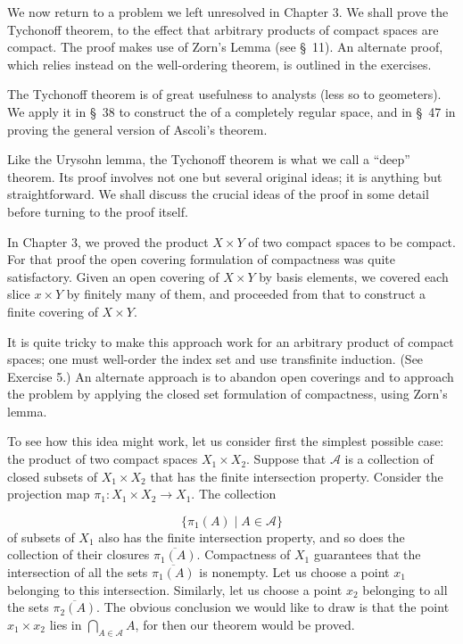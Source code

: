 
We now return to a problem we left unresolved in Chapter 3. We shall prove the Tychonoff theorem, to the effect that arbitrary products of compact spaces are compact. The proof makes use of Zorn's Lemma (see \S\ 11). An alternate proof, which relies instead on the well-ordering theorem, is outlined in the exercises.

The Tychonoff theorem is of great usefulness to analysts (less so to geometers). We apply it in \S\ 38 to construct the  of a completely regular space, and in \S\ 47 in proving the general version of Ascoli's theorem.


Like the Urysohn lemma, the Tychonoff theorem is what we call a ``deep'' theorem. Its proof involves not one but several original ideas; it is anything but straightforward. We shall discuss the crucial ideas of the proof in some detail before turning to the proof itself.

In Chapter 3, we proved the product \(X \times Y\) of two compact spaces to be compact. For that proof the open covering formulation of compactness was quite satisfactory. Given an open covering of \(X \times Y\) by basis elements, we covered each slice \(x \times Y\) by finitely many of them, and proceeded from that to construct a finite covering of \(X \times Y\).

It is quite tricky to make this approach work for an arbitrary product of compact spaces; one must well-order the index set and use transfinite induction. (See Exercise 5.) An alternate approach is to abandon open coverings and to approach the problem by applying the closed set formulation of compactness, using Zorn's lemma.

To see how this idea might work, let us consider first the simplest possible case: the product of two compact spaces \(X_{1} \times {X}_{2}\). Suppose that \(\mathcal{A}\) is a collection of closed subsets of \(X_{1} \times {X}_{2}\) that has the finite intersection property. Consider the projection map \({\pi }_{1} : X_{1} \times {X}_{2} \rightarrow {X}_{1}\). The collection

\[
\{ {{\pi }_{1}(A) \mid A \in \mathcal{A}}\}
\]
of subsets of \(X_{1}\) also has the finite intersection property, and so does the collection of their closures \(\overline{{\pi }_{1}(A) }\). Compactness of \(X_{1}\) guarantees that the intersection of all the sets \(\overline{{\pi }_{1}(A) }\) is nonempty. Let us choose a point \(x_{1}\) belonging to this intersection. Similarly, let us choose a point \(x_{2}\) belonging to all the sets \(\overline{{\pi }_{2}(A) }\). The obvious conclusion we would like to draw is that the point \(x_{1} \times {x}_{2}\) lies in \(\mathop{\bigcap }\limits_{{A \in \mathcal{A}}}A\), for then our theorem would be proved.

